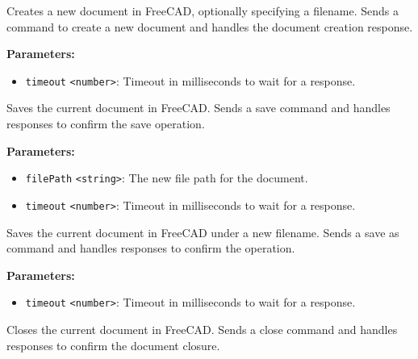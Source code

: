 \documentclass[12pt,a4paper]{article}
\begin{document}
\noindent Creates a new document in FreeCAD, optionally specifying a filename.
Sends a command to create a new document and handles the document creation response.

\vspace{5mm}
\noindent {}


\noindent \textbf{Parameters:}
\begin{itemize}
  \item \texttt{timeout} \texttt{<number>}: Timeout in milliseconds to wait for a response.
\end{itemize}

\noindent Saves the current document in FreeCAD.
Sends a save command and handles responses to confirm the save operation.

\vspace{5mm}
\noindent {}


\noindent \textbf{Parameters:}
\begin{itemize}
  \item \texttt{filePath} \texttt{<string>}: The new file path for the document.
  \item \texttt{timeout} \texttt{<number>}: Timeout in milliseconds to wait for a response.
\end{itemize}

\noindent Saves the current document in FreeCAD under a new filename.
Sends a save as command and handles responses to confirm the operation.

\vspace{5mm}
\noindent {}


\noindent \textbf{Parameters:}
\begin{itemize}
  \item \texttt{timeout} \texttt{<number>}: Timeout in milliseconds to wait for a response.
\end{itemize}

\noindent Closes the current document in FreeCAD.
Sends a close command and handles responses to confirm the document closure.
\end{document}
